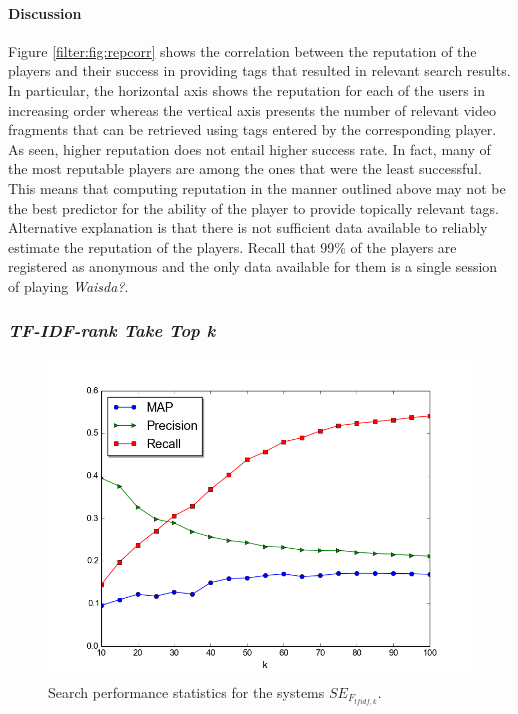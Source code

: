 \paragraph{Discussion} Figure \ref{filter:fig:repcorr} shows the correlation between the reputation of the players and their success in providing tags that resulted in relevant search results. In particular, the horizontal axis shows the reputation for each of the users in increasing order whereas the vertical axis presents the number of relevant video fragments that can be retrieved using tags entered by the corresponding player. As seen, higher reputation does not entail higher success rate. In fact, many of the most  reputable players are among the ones that were the least successful. This means that computing reputation in the manner outlined above may not be the best predictor for the ability of the player to provide topically relevant tags. Alternative explanation is that there is not sufficient data available to reliably estimate the reputation of the players. Recall that 99\% of the players are registered as anonymous and the only data available for them is a single session of playing \textit{Waisda?}.

\subsubsection{\textit{\textit{TF-IDF-rank Take Top k}}}

\begin{figure}
\centering
\includegraphics[scale=.4]{tfidfmets}
\caption{Search performance statistics for the systems $SE_{F_{tfidf,k}}$.}
\label{filter:fig:tfidfstats}
\end{figure}

